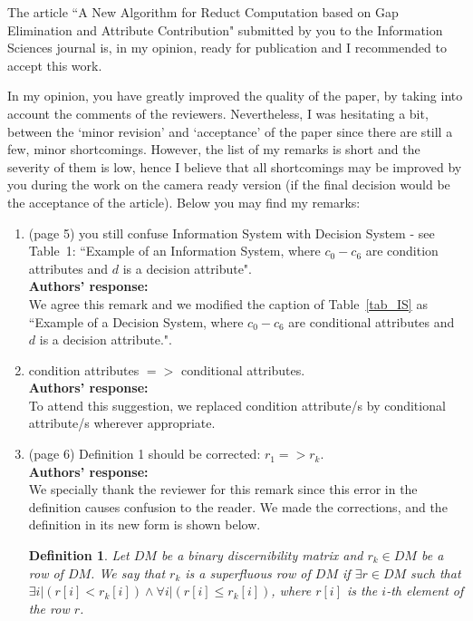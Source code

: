 \documentclass{letter}
\newtheorem{definition}{Definition}
\begin{document}
\begin{letter}{}
  The article ``A New Algorithm for Reduct Computation based on Gap Elimination and Attribute Contribution" submitted by you to the Information Sciences journal is, in my opinion, ready for publication and I recommended to accept this work. 
  
  In my opinion, you have greatly improved the quality of the paper, by taking into account the comments of the reviewers. Nevertheless, I was hesitating a bit, between the `minor revision' and `acceptance' of the paper since there are still a few, minor shortcomings. However, the list of my remarks is short and the severity of them is low, hence I believe that all shortcomings may be improved by you during the work on the camera ready version (if the final decision would be the acceptance of the article). Below you may find my remarks:  
 
 \begin{enumerate}  
	\item (page 5) you still confuse Information System with Decision System - see Table~1: ``Example of an Information System, where $c_0 - c_6$ are condition attributes and $d$ is a decision attribute".\\
	\textbf{Authors’ response:} \\	
	We agree this remark and we modified the caption of Table~\ref{tab_IS} as ``Example of a Decision System, where $c_0-c_6$ are conditional attributes and $d$ is a decision attribute.".
	
	\item condition attributes $=>$ conditional attributes.\\
	\textbf{Authors’ response:}\\
	To attend this suggestion, we replaced condition attribute/s by conditional attribute/s wherever appropriate.
	
	\item (page 6) Definition 1 should be corrected: $r_1 => r_k.$\\
	\textbf{Authors’ response:}\\
	We specially thank the reviewer for this remark since this error in the definition causes confusion to the reader. We made the corrections, and the definition in its new form is shown below.
	
	\begin{definition}\label{def:basic_row}
		Let $DM$ be a binary discernibility matrix and $r_k \in DM$ be a row of $DM$. We say that $r_k$ is a superfluous row of $DM$ if $\exists r \in DM$ such that $\exists i | (r[i] < r_k[i]) \wedge \forall i | (r[i] \leq r_k[i])$, where $r[i]$ is the $i$-th element of the row $r$.
		

\end{definition}
\end{enumerate}
\end{letter}
\end{document}
